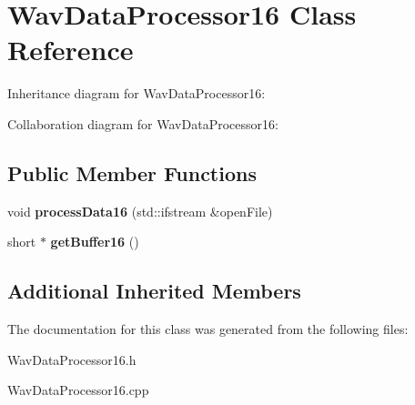 \hypertarget{classWavDataProcessor16}{}\section{Wav\+Data\+Processor16 Class Reference}
\label{classWavDataProcessor16}


Inheritance diagram for Wav\+Data\+Processor16\+:


Collaboration diagram for Wav\+Data\+Processor16\+:
\subsection*{Public Member Functions}
\begin{DoxyCompactItemize}
\item 
\mbox{\label{classWavDataProcessor16_a5e42b4458ca70d2ff9cee148a195be68}} 
void {\bfseries process\+Data16} (std\+::ifstream \&open\+File)
\item 
\mbox{\label{classWavDataProcessor16_aeda7be4542b69a9e8bf14e9e469d163e}} 
short $\ast$ {\bfseries get\+Buffer16} ()
\end{DoxyCompactItemize}
\subsection*{Additional Inherited Members}


The documentation for this class was generated from the following files\+:\begin{DoxyCompactItemize}
\item 
Wav\+Data\+Processor16.\+h\item 
Wav\+Data\+Processor16.\+cpp\end{DoxyCompactItemize}
